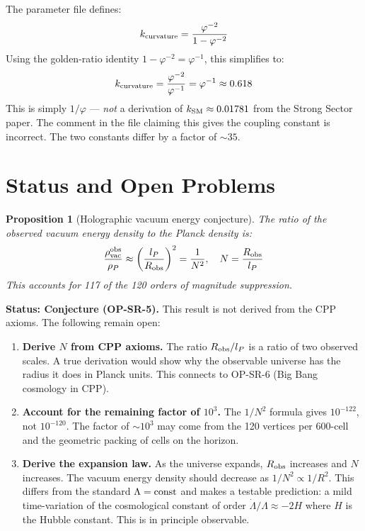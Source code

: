 \documentclass[11pt]{article}
\newtheorem{proposition}{Proposition}
\begin{document}
The parameter file defines:
\begin{equation}
k_{\rm curvature} = \frac{\varphi^{-2}}{1 - \varphi^{-2}}
\end{equation}
Using the golden-ratio identity $1 - \varphi^{-2} = \varphi^{-1}$,
this simplifies to:
\begin{equation}
k_{\rm curvature} = \frac{\varphi^{-2}}{\varphi^{-1}} = \varphi^{-1}
\approx 0.618
\end{equation}
This is simply $1/\varphi$ — \emph{not} a derivation of $k_{\rm SM}
\approx 0.01781$ from the Strong Sector paper.
The comment in the file claiming this gives the coupling constant is
incorrect.  The two constants differ by a factor of $\sim 35$.

\section{Status and Open Problems}

\begin{proposition}[Holographic vacuum energy conjecture]
The ratio of the observed vacuum energy density to the Planck density is:
\[
\frac{\rho_{\rm vac}^{\rm obs}}{\rho_P}
\approx \left(\frac{l_P}{R_{\rm obs}}\right)^2
= \frac{1}{N^2},\quad N = \frac{R_{\rm obs}}{l_P}
\]
This accounts for 117 of the 120 orders of magnitude suppression.
\end{proposition}

\noindent\textbf{Status: Conjecture (OP-SR-5).}
This result is not derived from the CPP axioms.
The following remain open:
\begin{enumerate}
\item \textbf{Derive $N$ from CPP axioms.}  The ratio $R_{\rm obs}/l_P$
  is a ratio of two observed scales.  A true derivation would show
  why the observable universe has the radius it does in Planck units.
  This connects to OP-SR-6 (Big Bang cosmology in CPP).

\item \textbf{Account for the remaining factor of $10^3$.}
  The $1/N^2$ formula gives $10^{-122}$, not $10^{-120}$.
  The factor of $\sim 10^3$ may come from the 120 vertices per
  600-cell and the geometric packing of cells on the horizon.

\item \textbf{Derive the expansion law.}
  As the universe expands, $R_{\rm obs}$ increases and $N$ increases.
  The vacuum energy density should decrease as $1/N^2 \propto 1/R^2$.
  This differs from the standard $\Lambda = {\rm const}$ and makes
  a testable prediction: a mild time-variation of the cosmological
  constant of order $\dot{\Lambda}/\Lambda \approx -2H$ where $H$
  is the Hubble constant.  This is in principle observable.
\end{enumerate}
\end{document}
